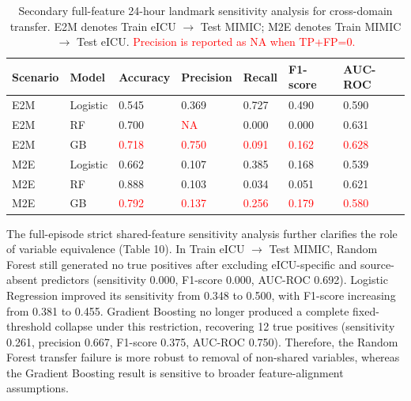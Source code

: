 \documentclass[utf8]{FrontiersinHarvard} %
\begin{document}
\begin{table}[h]
	\caption{Secondary full-feature 24-hour landmark sensitivity analysis for cross-domain transfer. E2M denotes Train eICU $\rightarrow$ Test MIMIC; M2E denotes Train MIMIC $\rightarrow$ Test eICU. \textcolor{red}{Precision is reported as NA when TP+FP=0.}}
	\label{tab:landmark_24h_transfer}
	\setlength{\tabcolsep}{3pt}
	\tiny
	\begin{tabular}{lllllll}
		\hline
		\textbf{Scenario} & \textbf{Model} & \textbf{Accuracy} & \textbf{Precision} & \textbf{Recall} & \textbf{F1-score} & \textbf{AUC-ROC} \\ \hline
		E2M & Logistic & 0.545 & 0.369 & 0.727 & 0.490 & 0.590 \\
		E2M & RF & 0.700 & \textcolor{red}{NA} & 0.000 & 0.000 & 0.631 \\
		E2M & GB & \textcolor{red}{0.718} & \textcolor{red}{0.750} & \textcolor{red}{0.091} & \textcolor{red}{0.162} & \textcolor{red}{0.628} \\
		M2E & Logistic & 0.662 & 0.107 & 0.385 & 0.168 & 0.539 \\
		M2E & RF & 0.888 & 0.103 & 0.034 & 0.051 & 0.621 \\
		M2E & GB & \textcolor{red}{0.792} & \textcolor{red}{0.137} & \textcolor{red}{0.256} & \textcolor{red}{0.179} & \textcolor{red}{0.580} \\ \hline
	\end{tabular}
\end{table}

The full-episode strict shared-feature sensitivity analysis further clarifies the role of variable equivalence (Table 10). In Train eICU $\rightarrow$ Test MIMIC, Random Forest still generated no true positives after excluding eICU-specific and source-absent predictors (sensitivity 0.000, F1-score 0.000, AUC-ROC 0.692). Logistic Regression improved its sensitivity from 0.348 to 0.500, with F1-score increasing from 0.381 to 0.455. Gradient Boosting no longer produced a complete fixed-threshold collapse under this restriction, recovering 12 true positives (sensitivity 0.261, precision 0.667, F1-score 0.375, AUC-ROC 0.750). Therefore, the Random Forest transfer failure is more robust to removal of non-shared variables, whereas the Gradient Boosting result is sensitive to broader feature-alignment assumptions.
\end{document}
